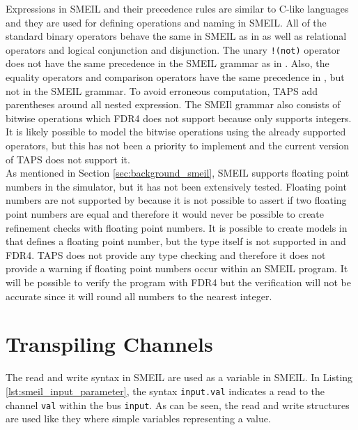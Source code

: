 Expressions in SMEIL and their precedence rules are similar to C-like languages and they are used for defining operations and naming in SMEIL. All of the standard binary operators behave the same in SMEIL as in \cspm{} as well as relational operators and logical conjunction and disjunction. The unary \texttt{!(not)} operator does not have the same precedence in the SMEIL grammar as in \cspm{}. Also, the equality operators and comparison operators have the same precedence in \cspm{}, but not in the SMEIL grammar. To avoid erroneous computation, TAPS add parentheses around all nested expression. The SMEIl grammar also consists of bitwise operations which FDR4 does not support because \cspm{} only supports integers. It is likely possible to model the bitwise operations using the already supported operators, but this has not been a priority to implement and the current version of TAPS does not support it.\\

As mentioned in Section \ref{sec:background_smeil}, SMEIL supports floating point numbers in the simulator, but it has not been extensively tested. Floating point numbers are not supported by \cspm{}\cite{Scattergood2011} because it is not possible to assert if two floating point numbers are equal and therefore it would never be possible to create refinement checks with floating point numbers. It is possible to create models in \cspm{} that defines a floating point number, but the type itself is not supported in \cspm{} and FDR4. TAPS does not provide any type checking and therefore it does not provide a warning if floating point numbers occur within an SMEIL program. It will be possible to verify the program with FDR4 but the verification will not be accurate since it will round all numbers to the nearest integer.
\section{Transpiling Channels}
 The read and write syntax in SMEIL are used as a variable in SMEIL. In Listing \ref{lst:smeil_input_parameter}, the syntax \texttt{input.val} indicates a read to the channel \texttt{val} within the bus \texttt{input}. As can be seen, the read and write structures are used like they where simple variables representing a value.

